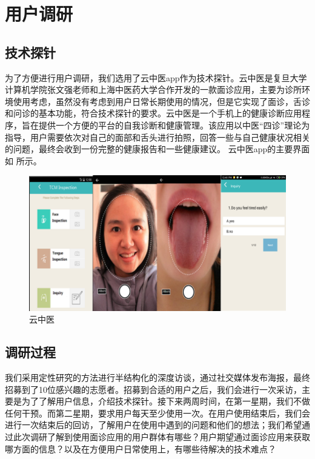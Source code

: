 \chapter{用户调研}


\section{技术探针}
为了方便进行用户调研，我们选用了云中医app作为技术探针。云中医是复旦大学计算机学院张文强老师和上海中医药大学合作开发的一款面诊应用，主要为诊所环境使用考虑，虽然没有考虑到用户日常长期使用的情况，但是它实现了面诊，舌诊和问诊的基本功能，符合技术探针的要求。云中医是一个手机上的健康诊断应用程序，旨在提供一个方便的平台的自我诊断和健康管理。该应用以中医“四诊”理论为指导，用户需要依次对自己的面部和舌头进行拍照，回答一些与自己健康状况相关的问题，最终会收到一份完整的健康报告和一些健康建议。
云中医app的主要界面如 所示。

\begin{figure}
    \centering
    \includegraphics{images/main.png}
    \caption{云中医}
    \label{fig:main}
\end{figure}

\section{调研过程}
 
我们采用定性研究的方法进行半结构化的深度访谈，通过社交媒体发布海报，最终招募到了10位感兴趣的志愿者。招募到合适的用户之后，我们会进行一次采访，主要是为了了解用户信息，介绍技术探针。接下来两周时间，在第一星期，我们不做任何干预。而第二星期，要求用户每天至少使用一次。在用户使用结束后，我们会进行一次结束后的回访，了解用户在使用中遇到的问题和他们的想法；我们希望通过此次调研了解到使用面诊应用的用户群体有哪些？用户期望通过面诊应用来获取哪方面的信息？以及在方便用户日常使用上，有哪些待解决的技术难点？

